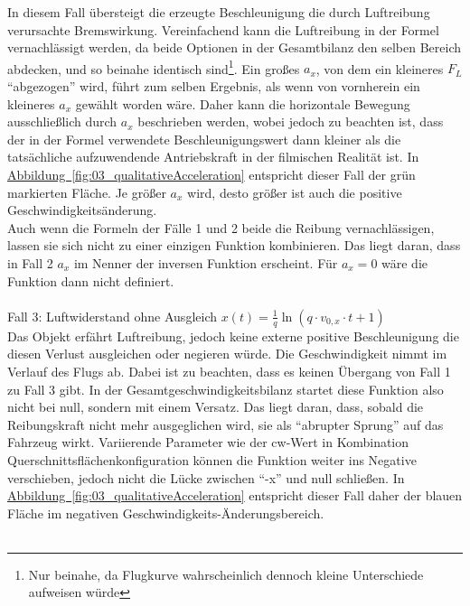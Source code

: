 In diesem Fall übersteigt die erzeugte Beschleunigung die durch Luftreibung verursachte Bremswirkung. Vereinfachend kann die Luftreibung in der Formel vernachlässigt werden, da beide Optionen in der Gesamtbilanz den selben Bereich abdecken, und so beinahe identisch sind\footnote{Nur beinahe, da Flugkurve wahrscheinlich dennoch kleine Unterschiede aufweisen würde}. Ein großes $a_x$, von dem ein kleineres $F_L$ \enquote{abgezogen} wird, führt zum selben Ergebnis, als wenn von vornherein ein kleineres $a_x$ gewählt worden wäre. Daher kann die horizontale Bewegung ausschließlich durch $a_x$ beschrieben werden, wobei jedoch zu beachten ist, dass der in der Formel verwendete Beschleunigungswert dann kleiner als die tatsächliche aufzuwendende Antriebskraft in der filmischen Realität ist. In \hyperref[fig:03_qualitativeAcceleration]{Abbildung~\ref*{fig:03_qualitativeAcceleration}} entspricht dieser Fall der grün markierten Fläche. Je größer $a_x$ wird, desto größer ist auch die positive Geschwindigkeitsänderung.
\\
Auch wenn die Formeln der Fälle 1 und 2 beide die Reibung vernachlässigen, lassen sie sich nicht zu einer einzigen Funktion kombinieren. Das liegt daran, dass in Fall 2 $a_x$ im Nenner der inversen Funktion erscheint. Für $a_x = 0$ wäre die Funktion dann nicht definiert. 
\\
\\
Fall 3: Luftwiderstand ohne Ausgleich $x(t) = \frac{1}{q} \ln\left(q \cdot v_{0,x} \cdot t + 1 \right)$\\
Das Objekt erfährt Luftreibung, jedoch keine externe positive Beschleunigung die diesen Verlust ausgleichen oder negieren würde. Die Geschwindigkeit nimmt im Verlauf des Flugs ab. Dabei ist zu beachten, dass es keinen Übergang von Fall 1 zu Fall 3 gibt. In der Gesamtgeschwindigkeitsbilanz startet diese Funktion also nicht bei null, sondern mit einem Versatz. Das liegt daran, dass, sobald die Reibungskraft nicht mehr ausgeglichen wird, sie als \enquote{abrupter Sprung} auf das Fahrzeug wirkt. Variierende Parameter wie der cw-Wert in Kombination Querschnittsflächenkonfiguration können die Funktion weiter ins Negative verschieben, jedoch nicht die Lücke zwischen \enquote{-x} und null schließen. In \hyperref[fig:03_qualitativeAcceleration]{Abbildung~\ref*{fig:03_qualitativeAcceleration}} entspricht dieser Fall daher der blauen Fläche im negativen Geschwindigkeits-Änderungsbereich. 
\\
\\
